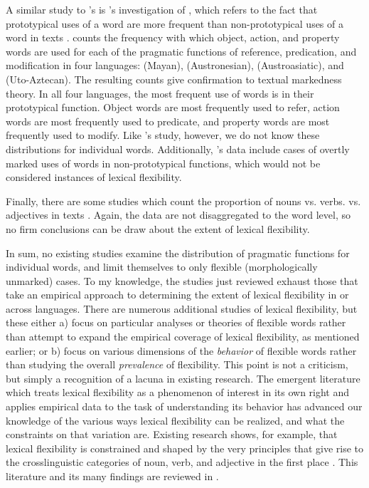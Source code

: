 A similar study to \citeauthor{Thompson1989}'s is \citeauthor{Croft1991}'s \parencite*[§2.5]{Croft1991} investigation of , which refers to the fact that prototypical uses of a word are more frequent than non-prototypical uses of a word in texts . \citeauthor{Croft1991} counts the frequency with which object, action, and property words are used for each of the pragmatic functions of reference, predication, and modification in four languages:  (Mayan),  (Austronesian),  (Austroasiatic), and  (Uto-Aztecan). The resulting counts give confirmation to textual markedness theory. In all four languages, the most frequent use of words is in their prototypical function. Object words are most frequently used to refer, action words are most frequently used to predicate, and property words are most frequently used to modify. Like \citeauthor{Thompson1989}'s \parencite*{Thompson1989} study, however, we do not know these distributions for individual words. Additionally, \citeauthor{Croft1991}'s data include cases of overtly marked uses of words in non-prototypical functions, which would not be considered instances of lexical flexibility.

Finally, there are some studies which count the proportion of nouns vs. verbs. vs. adjectives in  texts \parencites{Hudson1994}{PolinskyMagyar2020}. Again, the data are not disaggregated to the word level, so no firm conclusions can be draw about the extent of lexical flexibility.

In sum, no existing studies examine the distribution of pragmatic functions for individual words, and limit themselves to only flexible (morphologically unmarked) cases. To my knowledge, the studies just reviewed exhaust those that take an empirical approach to determining the extent of lexical flexibility in or across languages. There are numerous additional studies of lexical flexibility, but these either a) focus on particular analyses or theories of flexible words rather than attempt to expand the empirical coverage of lexical flexibility, as mentioned earlier; or b) focus on various dimensions of the \emph{behavior} of flexible words rather than studying the overall \emph{prevalence} of flexibility. This point is not a criticism, but simply a recognition of a lacuna in existing research. The emergent literature which treats lexical flexibility as a phenomenon of interest in its own right and applies empirical data to the task of understanding its behavior has advanced our knowledge of the various ways lexical flexibility can be realized, and what the constraints on that variation are. Existing research shows, for example, that lexical flexibility is constrained and shaped by the very principles that give rise to the crosslinguistic categories of noun, verb, and adjective in the first place \parencites{Croft2000}{Croft2005}{CroftLier2012}. This literature and its many findings are reviewed in .

